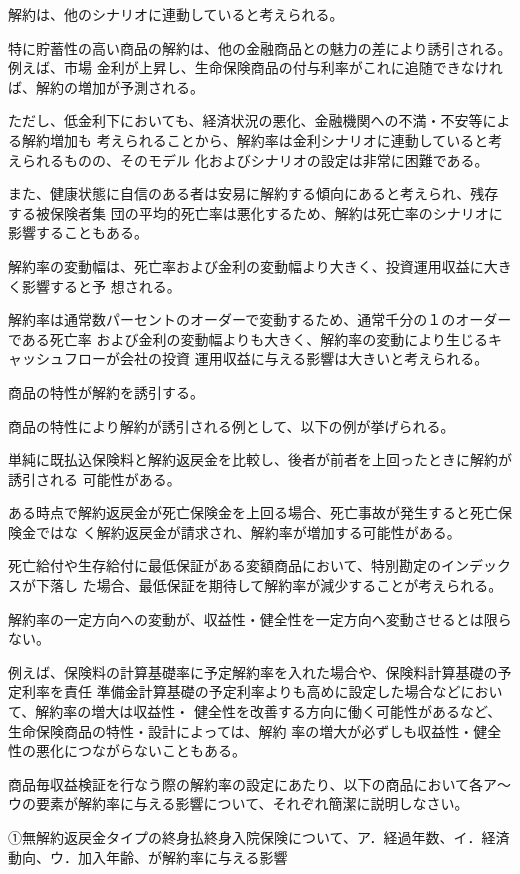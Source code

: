 \documentclass[report,gutter=10mm,fore-edge=10mm,uplatex,dvipdfmx]{jlreq}
\begin{document}
解約は、他のシナリオに連動していると考えられる。

特に貯蓄性の高い商品の解約は、他の金融商品との魅力の差により誘引される。例えば、市場
金利が上昇し、生命保険商品の付与利率がこれに追随できなければ、解約の増加が予測される。

ただし、低金利下においても、経済状況の悪化、金融機関への不満・不安等による解約増加も
考えられることから、解約率は金利シナリオに連動していると考えられるものの、そのモデル
化およびシナリオの設定は非常に困難である。

また、健康状態に自信のある者は安易に解約する傾向にあると考えられ、残存する被保険者集
団の平均的死亡率は悪化するため、解約は死亡率のシナリオに影響することもある。

解約率の変動幅は、死亡率および金利の変動幅より大きく、投資運用収益に大きく影響すると予
想される。

解約率は通常数パーセントのオーダーで変動するため、通常千分の１のオーダーである死亡率
および金利の変動幅よりも大きく、解約率の変動により生じるキャッシュフローが会社の投資
運用収益に与える影響は大きいと考えられる。

商品の特性が解約を誘引する。

商品の特性により解約が誘引される例として、以下の例が挙げられる。

単純に既払込保険料と解約返戻金を比較し、後者が前者を上回ったときに解約が誘引される
可能性がある。

ある時点で解約返戻金が死亡保険金を上回る場合、死亡事故が発生すると死亡保険金ではな
く解約返戻金が請求され、解約率が増加する可能性がある。

死亡給付や生存給付に最低保証がある変額商品において、特別勘定のインデックスが下落し
た場合、最低保証を期待して解約率が減少することが考えられる。

解約率の一定方向への変動が、収益性・健全性を一定方向へ変動させるとは限らない。

例えば、保険料の計算基礎率に予定解約率を入れた場合や、保険料計算基礎の予定利率を責任
準備金計算基礎の予定利率よりも高めに設定した場合などにおいて、解約率の増大は収益性・
健全性を改善する方向に働く可能性があるなど、生命保険商品の特性・設計によっては、解約
率の増大が必ずしも収益性・健全性の悪化につながらないこともある。

商品毎収益検証を行なう際の解約率の設定にあたり、以下の商品において各ア～ウの要素が解約率に与える影響について、それぞれ簡潔に説明しなさい。

①無解約返戻金タイプの終身払終身入院保険について、ア．経過年数、イ．経済動向、ウ．加入年齢、が解約率に与える影響
\end{document}
